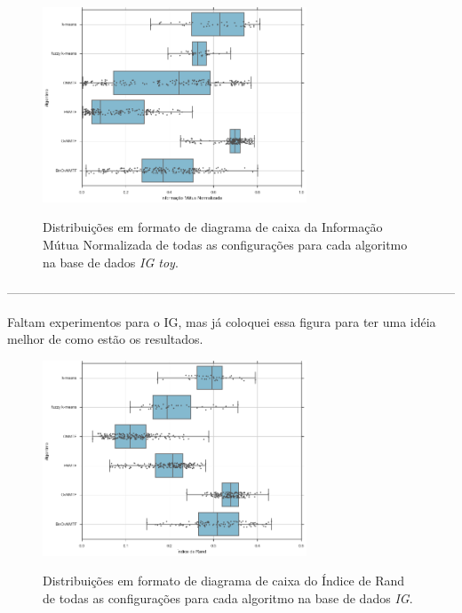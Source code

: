 \documentclass[
    12pt,                %
    oneside,            %
    a4paper,            %
    english,            %
    brazil                %
    ]{abntex2ppgsi}
\begin{document}
\begin{figure}[H]
    \centering
    \caption{Distribuições em formato de diagrama de caixa da Informação Mútua Normalizada de todas as configurações para cada algoritmo na base de dados \textit{IG toy}.}
    \includegraphics[width=0.7\textwidth]{img/boxplot-all-nmi-igtoy.png}
    \label{fig:boxplot-all-nmi:igtoy}
\end{figure}

------------------------------------------------------------------------------------------------------------

Faltam experimentos para o IG, mas já coloquei essa figura para ter uma idéia melhor de como estão os resultados.

\begin{figure}[H]
    \centering
    \caption{Distribuições em formato de diagrama de caixa do Índice de Rand de todas as configurações para cada algoritmo na base de dados \textit{IG}.}
    \includegraphics[width=0.7\textwidth]{img/boxplot-all-rand-ig.png}
    \label{fig:boxplot-all-rand:ig}
\end{figure}
\end{document}
